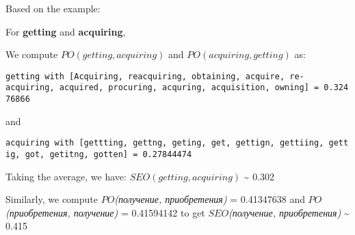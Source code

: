 \documentclass[]{article}
\begin{document}
Based on the example:

For \textbf{getting} and \textbf{acquiring},

We compute \(PO(getting, acquiring)\) and \(PO(acquiring, getting)\) as:

\texttt{getting\ with\ {[}Acquiring,\ reacquiring,\ obtaining,\ acquire,\ re-acquiring,\ acquired,\ procuring,\ acquring,\ acquisition,\ owning{]}\ =\ 0.32476866}

and

\texttt{acquiring\ with\ {[}gettting,\ gettng,\ geting,\ get,\ gettign,\ gettiing,\ gettig,\ got,\ getitng,\ gotten{]}\ =\ 0.27844474}

Taking the average, we have: \(SEO(getting, acquiring)\)
\textasciitilde{} 0.302

Similarly, we compute \(PO\)\emph{(получение, приобретения)} =
0.41347638 and \(PO\)\emph{(приобретения, получение)} = 0.41594142 to
get \(SEO\)\emph{(получение, приобретения)} \textasciitilde{} 0.415
\end{document}
